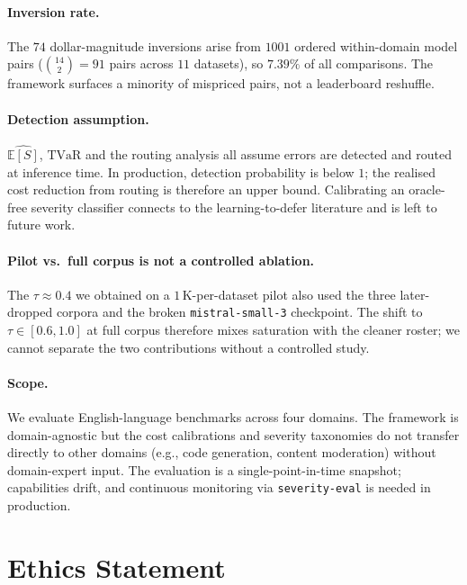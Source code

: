 \documentclass[11pt]{article}
\newcommand{\ES}{\mathbb{E}[S]}
\newcommand{\TVaR}{\mathrm{TVaR}}
\newcommand{\seveval}{\texttt{severity-eval}}
\begin{document}
\paragraph{Inversion rate.}
The $74$ dollar-magnitude inversions arise from $1001$ ordered
within-domain model pairs ($\binom{14}{2} = 91$ pairs across
$11$ datasets), so $7.39\%$ of all comparisons. The framework
surfaces a
minority of mispriced pairs, not a leaderboard reshuffle.

\paragraph{Detection assumption.}
$\widehat{\ES}$, $\TVaR$ and the routing analysis all assume
errors are detected and routed at inference time. In production,
detection probability is below $1$; the realised cost reduction
from routing is therefore an upper bound. Calibrating an
oracle-free severity classifier connects to the learning-to-defer
literature \citep{madras2018predict,mozannar2020consistent} and
is left to future work.

\paragraph{Pilot vs.\ full corpus is not a controlled ablation.}
The $\tau \approx 0.4$ we obtained on a $1$\,K-per-dataset pilot
also used the three later-dropped corpora and the broken
\texttt{mistral-small-3} checkpoint. The shift to $\tau \in
[0.6, 1.0]$ at full corpus therefore mixes saturation with the
cleaner roster; we cannot separate the two contributions without
a controlled study.

\paragraph{Scope.}
We evaluate English-language benchmarks across four domains.
The framework is domain-agnostic but the cost calibrations and
severity taxonomies do not transfer directly to other domains
(e.g., code generation, content moderation) without
domain-expert input. The evaluation is a single-point-in-time
snapshot; capabilities drift, and continuous monitoring via
\seveval{} is needed in production.


\section*{Ethics Statement}
\label{sec:ethics}
\end{document}
